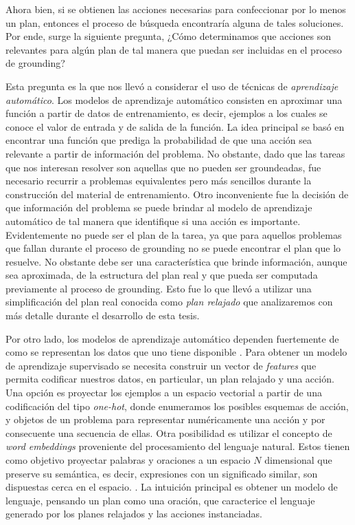 Ahora bien, si se obtienen las acciones necesarias para confeccionar por lo
menos un plan, entonces el proceso de búsqueda encontraría alguna de tales
soluciones. Por ende, surge la siguiente pregunta, ¿Cómo determinamos que
acciones son relevantes para algún plan de tal manera que puedan ser incluidas
en el proceso de grounding?

Esta pregunta es la que nos llevó a considerar el uso de técnicas de
\emph{aprendizaje automático}. Los modelos de aprendizaje automático consisten en aproximar una función a partir de datos de entrenamiento, es decir, ejemplos a los cuales se conoce el valor de entrada y de salida de la función. La idea principal se basó en encontrar una función que prediga la probabilidad de que una acción sea relevante a partir de información del problema. No obstante, dado que las tareas que
nos interesan resolver son aquellas que no pueden ser groundeadas, fue necesario recurrir a problemas equivalentes pero más sencillos durante la construcción del material de entrenamiento. Otro inconveniente fue la decisión de que información del problema se puede brindar al modelo de aprendizaje automático de tal manera que identifique si una acción es importante. Evidentemente no puede ser el plan de la tarea, ya que para aquellos problemas que fallan durante el proceso de grounding no se puede encontrar el plan que lo resuelve. No obstante debe ser una característica que brinde información, aunque sea aproximada, de la estructura del plan real y que pueda ser computada previamente al proceso de grounding. Esto fue lo que llevó a utilizar una simplificación del plan real conocida como \emph{plan relajado} que analizaremos con más detalle durante el desarrollo de esta tesis.

Por otro lado, los modelos de aprendizaje automático dependen fuertemente de
como se representan los datos que uno tiene disponible \citep{Heaton-2016-AnEA}.
Para obtener un modelo de aprendizaje supervisado se necesita construir un
vector de \emph{features} que permita codificar nuestros datos, en particular,
un plan relajado y una acción. Una opción es proyectar los ejemplos a un espacio
vectorial a partir de una codificación del tipo \emph{one-hot}, donde enumeramos
los posibles esquemas de acción, y objetos de un problema para representar
numéricamente una acción y por consecuente una secuencia de ellas. Otra
posibilidad es utilizar el concepto de \emph{word embeddings} proveniente del
procesamiento del lenguaje natural. Estos tienen como objetivo proyectar
palabras y oraciones a un espacio $N$ dimensional que preserve su semántica, es
decir, expresiones con un significado similar, son dispuestas cerca en el
espacio. \citep{Mikolov-Ilya-Kai-Greg-Jeffrey-2013,
Pennington-Jeffrey-Socher-Richard-Manning-Christopher-2014,
Bojanowski-Grave-Joulin-Mikolov-2016}. La intuición principal es obtener un
modelo de lenguaje, pensando un plan como una oración, que caracterice el
lenguaje generado por los planes relajados y las acciones instanciadas. 


